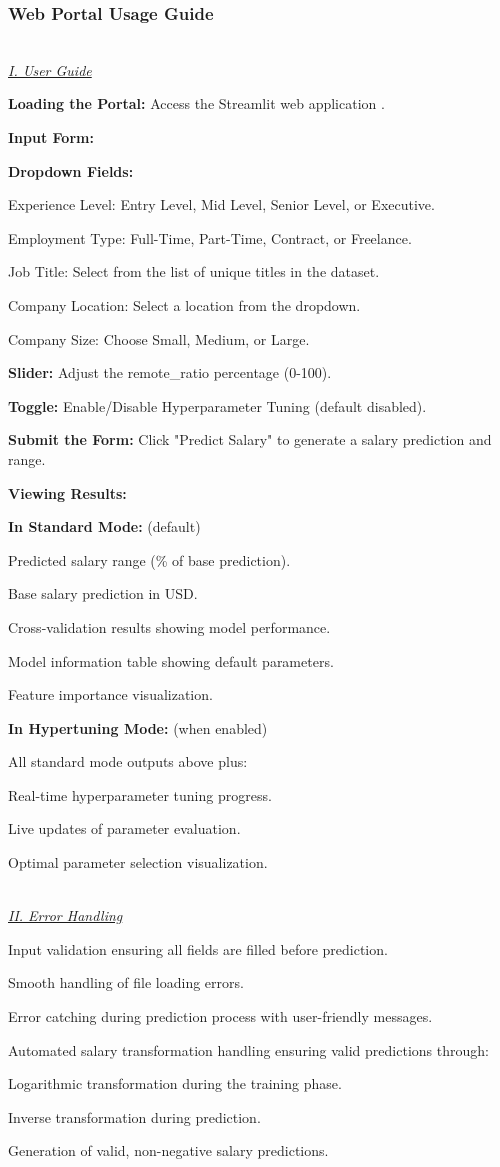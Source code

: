\documentclass[11pt,a4paper]{article}
\newcommand{\SubItem}[1]{
  {\setlength\itemindent{13pt} \item[◦] #1}
}
\newcommand{\SubSubItem}[1]{
  {\setlength\itemindent{26pt} \item[◦] #1}
}
\newcommand{\subsubsubsection}[1]{
  {\setlength\itemindent{13pt} \textit{\uline{\\#1\\}}} 
}
\begin{document}
\subsubsection{Web Portal Usage Guide}
\subsubsubsection{I. User Guide}
\begin{itemize}
\item \textbf{Loading the Portal:} Access the Streamlit web application \cite{Streamlit}.
\item \textbf{Input Form:} 
\SubItem{\textbf{Dropdown Fields:}} 
\SubSubItem{Experience Level: Entry Level, Mid Level, Senior Level, or Executive.}
\SubSubItem{Employment Type: Full-Time, Part-Time, Contract, or Freelance.}
\SubSubItem{Job Title: Select from the list of unique titles in the dataset.}
\SubSubItem{Company Location: Select a location from the dropdown.}
\SubSubItem{Company Size: Choose Small, Medium, or Large.}
\SubItem{\textbf{Slider:} Adjust the remote_ratio percentage (0-100).} 
\SubItem{\textbf{Toggle:} Enable/Disable Hyperparameter Tuning (default disabled).} 
\item \textbf{Submit the Form:} Click "Predict Salary" to generate a salary prediction and range.
\item \textbf{Viewing Results:} 
\SubItem{\textbf{In Standard Mode:} (default)} 
\SubSubItem{Predicted salary range (\% of base prediction).}
\SubSubItem{Base salary prediction in USD.}
\SubSubItem{Cross-validation results showing model performance.}
\SubSubItem{Model information table showing default parameters.}
\SubSubItem{Feature importance visualization.}
\SubItem{\textbf{In Hypertuning Mode:} (when enabled)} 
\SubSubItem{All standard mode outputs above plus:}
\SubSubItem{Real-time hyperparameter tuning progress.}
\SubSubItem{Live updates of parameter evaluation.}
\SubSubItem{Optimal parameter selection visualization.}
\end{itemize}

\subsubsubsection{II. Error Handling}
\begin{itemize}
\item Input validation ensuring all fields are filled before prediction.
\item Smooth handling of file loading errors.
\item Error catching during prediction process with user-friendly messages.
\item Automated salary transformation handling ensuring valid predictions through:
\SubItem{Logarithmic transformation during the training phase.}
\SubItem{Inverse transformation during prediction.}
\SubItem{Generation of valid, non-negative salary predictions.}
\end{itemize}
\end{document}
